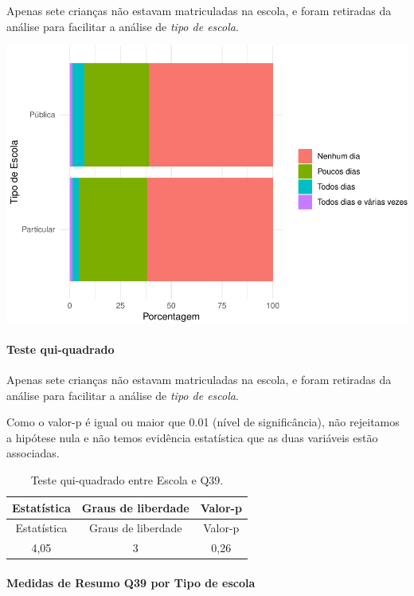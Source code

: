 \documentclass[]{article}
\let\oldparagraph\paragraph
\renewcommand{\paragraph}[1]{\oldparagraph{#1}\mbox{}}
\begin{document}
Apenas sete crianças não estavam matriculadas na escola, e foram retiradas da análise para facilitar a análise de \emph{tipo de escola}.

\begin{center}\includegraphics[width=0.75\linewidth]{relatorio_covid19_files/figure-latex/unnamed-chunk-1528-1} \end{center}

\hypertarget{teste-qui-quadrado-131}{%
\paragraph{Teste qui-quadrado}\label{teste-qui-quadrado-131}}

Apenas sete crianças não estavam matriculadas na escola, e foram retiradas da análise para facilitar a análise de \emph{tipo de escola}.

Como o valor-p é igual ou maior que 0.01 (nível de significância), não rejeitamos a hipótese nula e não temos evidência estatística que as duas variáveis estão associadas.

\begin{longtable}[]{@{}ccc@{}}
\caption{\label{tab:unnamed-chunk-1530}Teste qui-quadrado entre Escola e Q39.}\tabularnewline
\toprule
Estatística & Graus de liberdade & Valor-p\tabularnewline
\midrule
\endfirsthead
\toprule
Estatística & Graus de liberdade & Valor-p\tabularnewline
\midrule
\endhead
4,05 & 3 & 0,26\tabularnewline
\bottomrule
\end{longtable}

\cleardoublepage

\hypertarget{medidas-de-resumo-q39-por-tipo-de-escola}{%
\paragraph{Medidas de Resumo Q39 por Tipo de escola}\label{medidas-de-resumo-q39-por-tipo-de-escola}}
\end{document}

